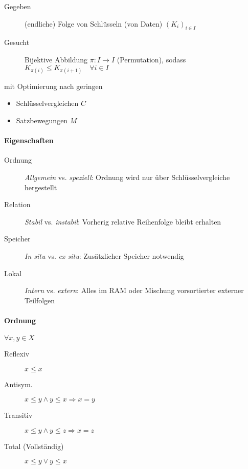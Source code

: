 \begin{description}
  \item[Gegeben] (endliche) Folge von Schlüsseln (von Daten) $(K_i)_{i \in I}$
  \item[Gesucht] Bijektive Abbildung $\pi: I \rightarrow I$ (Permutation), sodass $K_{\pi(i)} \leq K_{\pi(i + 1)} \quad \forall i \in I$
\end{description}

mit Optimierung nach geringen

\begin{itemize}
  \item Schlüsselvergleichen $C$
  \item Satzbewegungen $M$
\end{itemize}

\paragraph{Eigenschaften}

\begin{description}
  \item [Ordnung] \emph{Allgemein} vs. \emph{speziell}: Ordnung wird nur über Schlüsselvergleiche hergestellt
  \item [Relation] \emph{Stabil} vs. \emph{instabil}: Vorherig relative Reihenfolge bleibt erhalten
  \item [Speicher] \emph{In situ} vs. \emph{ex situ}: Zusätzlicher Speicher notwendig
  \item [Lokal] \emph{Intern} vs. \emph{extern}: Alles im RAM oder Mischung vorsortierter externer Teilfolgen
\end{description}

\paragraph{Ordnung} $\forall x, y \in X$

\begin{description}
  \item[Reflexiv] $x \leq x$
  \item[Antisym.] $x \leq y \land y \leq x \Rightarrow x = y$
  \item[Transitiv] $x \leq y \land y \leq z \Rightarrow x = z$
  \item[Total (Vollständig)] $x \leq y \lor y \leq x$
\end{description}

